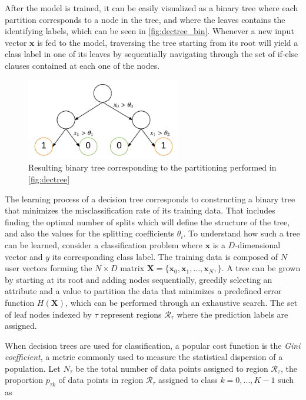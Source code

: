 \documentclass{kththesis}
\begin{document}
After the model is trained, it can be easily visualized as a binary tree where each partition corresponds to a node in the tree, and where the leaves contains the identifying labels, which can be seen in \autoref{fig:dectree_bin}. Whenever a new input vector $\mathbf{x}$ is fed to the model, traversing the tree starting from its root will yield a class label in one of its leaves by sequentially navigating through the set of if-else clauses contained at each one of the nodes.  
 
\begin{figure}[h]
    \centering
    \includegraphics[width=0.6\textwidth,keepaspectratio]{figures/dectree_bin.pdf}
    \caption{Resulting binary tree corresponding to the partitioning performed in \autoref{fig:dectree}}
    \label{fig:dectree_bin}
\end{figure}
 
The learning process of a decision tree corresponds to constructing a binary tree that minimizes the misclassification rate of its training data. That includes finding the optimal number of splits which will define the structure of the tree, and also the values for the splitting coefficients $\theta_i$. To understand how such a tree can be learned, consider a classification problem where $\mathbf{x}$ is a $D$-dimensional vector and $y$ its corresponding class label. The training data is composed of $N$ user vectors forming the $N \times D$ matrix $\mathbf{X} = \{\mathbf{x}_0, \mathbf{x}_1, ..., \mathbf{x}_N,\}$. A tree can be grown by starting at its root and adding nodes sequentially, greedily selecting an attribute and a value to partition the data that minimizes a predefined error function $H(\mathbf{X})$, which can be performed through an exhaustive search. The set of leaf nodes indexed by $\tau$ represent regions $\mathcal{R}_\tau$ where the prediction labels are assigned.

When decision trees are used for classification, a popular cost function is the \emph{Gini coefficient}, a metric commonly used to measure the statistical dispersion of a population. Let $N_\tau$ be the total number of data points assigned to region $\mathcal{R}_\tau$,  the proportion $p_{\tau k}$ of data points in region $\mathcal{R}_\tau$ assigned to class $k = 0,...,K-1$ such as 
\end{document}
